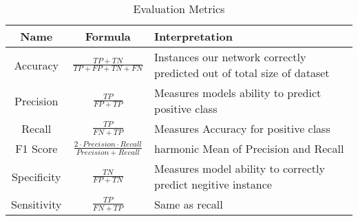 \begin{table}[ht!]
    \centering
    \begin{tabularx}{\textwidth}{|c|c|X|}
    \hline
    \textbf{Name} & \textbf{Formula} & \textbf{Interpretation} \\ \hline
        Accuracy & $\frac{TP + TN}{TP + FP + TN + FN}$ & Instances our network correctly predicted out of total size of dataset \\ \hline
        Precision & $\frac{TP}{FP + TP}$ & Measures models ability to predict positive class \\ \hline
        Recall & $\frac{TP}{FN + TP}$ & Measures Accuracy for positive class \\ \hline
        F1 Score & $\frac{2 \cdot Precision \cdot Recall}{Precision + Recall}$ & harmonic Mean of Precision and Recall \\ \hline
        Specificity & $\frac{TN}{FP + TN}$ & Measures model ability to correctly predict negitive instance \\ \hline
        Sensitivity & $\frac{TP}{FN + TP}$ & Same as recall \\ \hline
    \end{tabularx}
    \caption{Evaluation Metrics}
\end{table}
